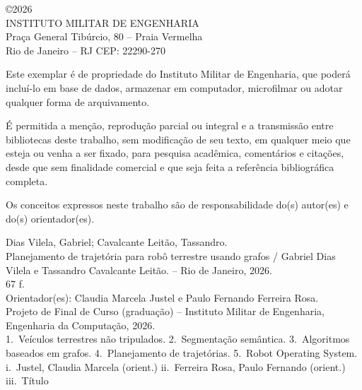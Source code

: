 \documentclass[
    12pt,
    openright,
    oneside,
    a4paper,
    english,
    brazil
]{abntex2}
\begin{document}
\begin{fichacatalografica}
    \vspace*{\fill}
    \begin{center}
    {\normalsize \copyright 2026\\
    INSTITUTO MILITAR DE ENGENHARIA\\
    Praça General Tibúrcio, 80 -- Praia Vermelha\\
    Rio de Janeiro -- RJ CEP: 22290-270}
    \end{center}

    \vspace{1cm}

    \noindent Este exemplar é de propriedade do Instituto Militar de Engenharia, que poderá incluí-lo em base de dados, armazenar em computador, microfilmar ou adotar qualquer forma de arquivamento.

    É permitida a menção, reprodução parcial ou integral e a transmissão entre bibliotecas deste trabalho, sem modificação de seu texto, em qualquer meio que esteja ou venha a ser fixado, para pesquisa acadêmica, comentários e citações, desde que sem finalidade comercial e que seja feita a referência bibliográfica completa.

    Os conceitos expressos neste trabalho são de responsabilidade do(s) autor(es) e do(s) orientador(es).

    \vspace{1cm}

    \noindent
    Dias Vilela, Gabriel; Cavalcante Leitão, Tassandro.\\
    Planejamento de trajetória para robô terrestre usando grafos / Gabriel Dias Vilela e Tassandro Cavalcante Leitão. -- Rio de Janeiro, 2026.\\
    67 f.\\[0.5em]
    Orientador(es): Claudia Marcela Justel e Paulo Fernando Ferreira Rosa.\\[0.5em]
    Projeto de Final de Curso (graduação) -- Instituto Militar de Engenharia, Engenharia da Computação, 2026.\\[0.5em]
    1.~Veículos terrestres não tripulados. 2.~Segmentação semântica. 3.~Algoritmos baseados em grafos. 4.~Planejamento de trajetórias. 5.~Robot Operating System. i.~Justel, Claudia Marcela (orient.) ii.~Ferreira Rosa, Paulo Fernando (orient.) iii.~Título
    \vspace*{\fill}
\end{fichacatalografica}
\end{document}
